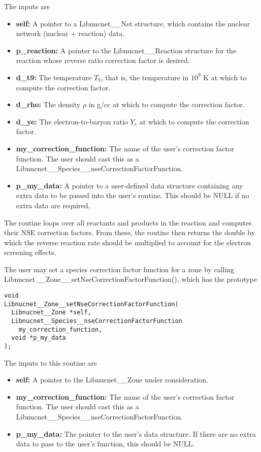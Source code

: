 \documentclass{article}    %
\begin{document}
The inputs are
\begin{itemize}

\item {\bf self:} A pointer to a Libnucnet\_\_Net structure, which contains
the nuclear network (nuclear + reaction) data.

\item {\bf p\_reaction:}  A pointer to the Libnucnet\_\_Reaction structure
for the reaction whose reverse ratio correction factor is desired.

\item {\bf d\_t9:}  The temperature $T_9$, that is, the temperature
in $10^9$ K at which to compute the correction factor.

\item {\bf d\_rho:}  The density $\rho$ in g/cc at which to compute
the correction factor.

\item {\bf d\_ye:}  The electron-to-baryon ratio $Y_e$ at which to compute
the correction factor.

\item {\bf my\_correction\_function:}  The
name of the user's correction factor function.  The user should cast this
as a Libnucnet\_\_Species\_\_nseCorrectionFactorFunction.

\item {\bf p\_my\_data:}  A pointer to a user-defined data structure
containing any extra data to be passed into the user's routine.  This should
be NULL if no extra data are required.

\end{itemize}

The routine loops over all reactants and products in the reaction and
computes their NSE correction factors.  From these, the routine then
returns the double by which the reverse reaction rate should be multiplied
to account for the electron screening effects.

The user may set a species correction factor function for a zone
by calling
Libnucnet\_\_Zone\_\_setNseCorrectionFactorFunction(),
which has the prototype

\begin{verbatim}
void
Libnucnet__Zone__setNseCorrectionFactorFunction(
  Libnucnet__Zone *self,
  Libnucnet__Species__nseCorrectionFactorFunction
    my_correction_function,
  void *p_my_data
);
\end{verbatim}

The inputs to this routine are
\begin{itemize}

\item {\bf self:}  A pointer to the Libnucnet\_\_Zone under consideration.

\item {\bf my\_correction\_function:}  The name of the user's correction
factor function.  The user should cast this as a
Libnucnet\_\_Species\_\_nseCorrectionFactorFunction.

\item {\bf p\_my\_data:}  The pointer to the user's data structure.  If there
are no extra data to pass to the user's function, this should be NULL.
\end{itemize}
\end{document}
